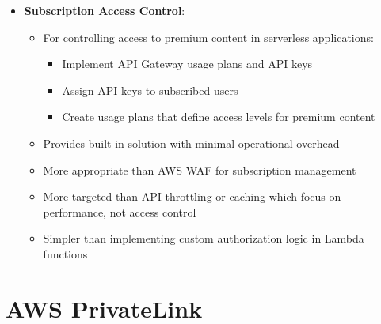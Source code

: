 \documentclass[11pt,a4paper]{report}
\begin{document}
\begin{itemize}
\begin{itemize}
\begin{itemize}
  \item Design a REST API using API Gateway to accept parameters like item prices
  \item Configure Lambda integration to perform tax calculations when requests are received
  \item Set appropriate throttling and scaling policies to handle traffic spikes
\end{itemize}
  \item Provides serverless architecture that minimizes operational overhead
  \item Automatically scales to handle holiday season traffic spikes without manual intervention
  \item More scalable and elastic than single EC2 instances or fixed-size instance pools
  \item Eliminates the need to manage and patch underlying infrastructure
\end{itemize}
  \item \textbf{Subscription Access Control}:
\begin{itemize}
  \item For controlling access to premium content in serverless applications:
\begin{itemize}
  \item Implement API Gateway usage plans and API keys
  \item Assign API keys to subscribed users
  \item Create usage plans that define access levels for premium content
\end{itemize}
  \item Provides built-in solution with minimal operational overhead
  \item More appropriate than AWS WAF for subscription management
  \item More targeted than API throttling or caching which focus on performance, not access control
  \item Simpler than implementing custom authorization logic in Lambda functions
\end{itemize}
\end{itemize}

\section{AWS PrivateLink}
\end{document}
